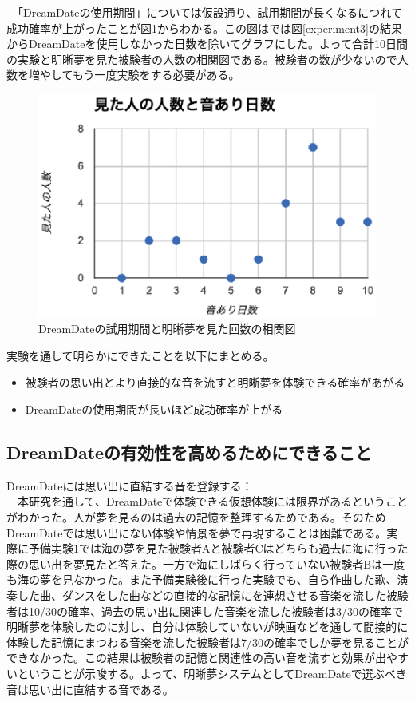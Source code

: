 　「DreamDateの使用期間」については仮設通り、試用期間が長くなるにつれて成功確率が上がったことが図\ref{dates}からわかる。この図はでは図\ref{experiment3}の結果からDreamDateを使用しなかった日数を除いてグラフにした。よって合計10日間の実験と明晰夢を見た被験者の人数の相関図である。被験者の数が少ないので人数を増やしてもう一度実験をする必要がある。
\begin{figure}[htbp]
\begin{center}
\includegraphics[width=12cm]{eps/experimentDates.eps}
\caption{DreamDateの試用期間と明晰夢を見た回数の相関図}
\label{dates}
\end{center}
\end{figure}

実験を通して明らかにできたことを以下にまとめる。
\begin{itemize}
\item 被験者の思い出とより直接的な音を流すと明晰夢を体験できる確率があがる
\item DreamDateの使用期間が長いほど成功確率が上がる
\end{itemize}

\subsection{DreamDateの有効性を高めるためにできること}
DreamDateには思い出に直結する音を登録する：\\
　本研究を通して、DreamDateで体験できる仮想体験には限界があるということがわかった。人が夢を見るのは過去の記憶を整理するためである。そのためDreamDateでは思い出にない体験や情景を夢で再現することは困難である。実際に予備実験1では海の夢を見た被験者Aと被験者Cはどちらも過去に海に行った際の思い出を夢見たと答えた。一方で海にしばらく行っていない被験者Bは一度も海の夢を見なかった。また予備実験後に行った実験でも、自ら作曲した歌、演奏した曲、ダンスをした曲などの直接的な記憶にを連想させる音楽を流した被験者は10/30の確率、過去の思い出に関連した音楽を流した被験者は3/30の確率で明晰夢を体験したのに対し、自分は体験していないが映画などを通して間接的に体験した記憶にまつわる音楽を流した被験者は7/30の確率でしか夢を見ることができなかった。この結果は被験者の記憶と関連性の高い音を流すと効果が出やすいということが示唆する。よって、明晰夢システムとしてDreamDateで選ぶべき音は思い出に直結する音である。\\

